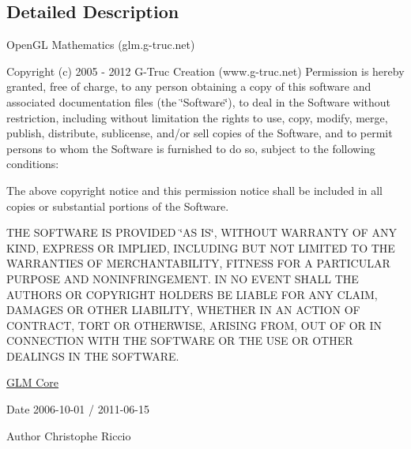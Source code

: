 \subsection{\-Detailed \-Description}
\-Open\-G\-L \-Mathematics (glm.\-g-\/truc.\-net)

\-Copyright (c) 2005 -\/ 2012 \-G-\/\-Truc \-Creation (www.\-g-\/truc.\-net) \-Permission is hereby granted, free of charge, to any person obtaining a copy of this software and associated documentation files (the \char`\"{}\-Software\char`\"{}), to deal in the \-Software without restriction, including without limitation the rights to use, copy, modify, merge, publish, distribute, sublicense, and/or sell copies of the \-Software, and to permit persons to whom the \-Software is furnished to do so, subject to the following conditions\-:

\-The above copyright notice and this permission notice shall be included in all copies or substantial portions of the \-Software.

\-T\-H\-E \-S\-O\-F\-T\-W\-A\-R\-E \-I\-S \-P\-R\-O\-V\-I\-D\-E\-D \char`\"{}\-A\-S I\-S\char`\"{}, \-W\-I\-T\-H\-O\-U\-T \-W\-A\-R\-R\-A\-N\-T\-Y \-O\-F \-A\-N\-Y \-K\-I\-N\-D, \-E\-X\-P\-R\-E\-S\-S \-O\-R \-I\-M\-P\-L\-I\-E\-D, \-I\-N\-C\-L\-U\-D\-I\-N\-G \-B\-U\-T \-N\-O\-T \-L\-I\-M\-I\-T\-E\-D \-T\-O \-T\-H\-E \-W\-A\-R\-R\-A\-N\-T\-I\-E\-S \-O\-F \-M\-E\-R\-C\-H\-A\-N\-T\-A\-B\-I\-L\-I\-T\-Y, \-F\-I\-T\-N\-E\-S\-S \-F\-O\-R \-A \-P\-A\-R\-T\-I\-C\-U\-L\-A\-R \-P\-U\-R\-P\-O\-S\-E \-A\-N\-D \-N\-O\-N\-I\-N\-F\-R\-I\-N\-G\-E\-M\-E\-N\-T. \-I\-N \-N\-O \-E\-V\-E\-N\-T \-S\-H\-A\-L\-L \-T\-H\-E \-A\-U\-T\-H\-O\-R\-S \-O\-R \-C\-O\-P\-Y\-R\-I\-G\-H\-T \-H\-O\-L\-D\-E\-R\-S \-B\-E \-L\-I\-A\-B\-L\-E \-F\-O\-R \-A\-N\-Y \-C\-L\-A\-I\-M, \-D\-A\-M\-A\-G\-E\-S \-O\-R \-O\-T\-H\-E\-R \-L\-I\-A\-B\-I\-L\-I\-T\-Y, \-W\-H\-E\-T\-H\-E\-R \-I\-N \-A\-N \-A\-C\-T\-I\-O\-N \-O\-F \-C\-O\-N\-T\-R\-A\-C\-T, \-T\-O\-R\-T \-O\-R \-O\-T\-H\-E\-R\-W\-I\-S\-E, \-A\-R\-I\-S\-I\-N\-G \-F\-R\-O\-M, \-O\-U\-T \-O\-F \-O\-R \-I\-N \-C\-O\-N\-N\-E\-C\-T\-I\-O\-N \-W\-I\-T\-H \-T\-H\-E \-S\-O\-F\-T\-W\-A\-R\-E \-O\-R \-T\-H\-E \-U\-S\-E \-O\-R \-O\-T\-H\-E\-R \-D\-E\-A\-L\-I\-N\-G\-S \-I\-N \-T\-H\-E \-S\-O\-F\-T\-W\-A\-R\-E.

\hyperlink{group__core}{\-G\-L\-M \-Core}

\begin{DoxyDate}{\-Date}
2006-\/10-\/01 / 2011-\/06-\/15 
\end{DoxyDate}
\begin{DoxyAuthor}{\-Author}
\-Christophe \-Riccio 
\end{DoxyAuthor}

